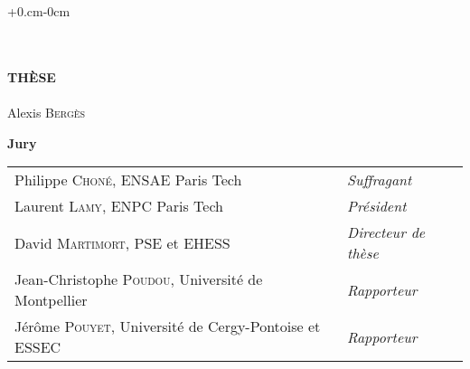 
\begin{titlepage}
\thispagestyle{empty}
\begin{adjustwidth}{+0.cm}{-0cm}
\begin{center}
 \\
\vspace*{3.5cm}
 \\
\vspace*{2.5cm}
\noindent \large \textbf{TH\`ESE} \\
\vspace*{0.4cm}
 \\
\vspace*{0.3cm}
\noindent \Large Alexis \textsc{Bergès} \\
\vspace*{2.5cm}
\end{center}
\begin{center}
\noindent \large \textbf{Jury} \\
\vspace{0.6cm}
\noindent \normalsize
\begin{tabular}{ll}
Philippe \textsc{Choné}, ENSAE Paris Tech & \textit{Suffragant} \\
Laurent \textsc{Lamy}, ENPC Paris Tech & \textit{Président} \\
David \textsc{Martimort}, PSE et EHESS & \textit{Directeur de thèse}\\
Jean-Christophe \textsc{Poudou}, Université de Montpellier & \textit{Rapporteur} \\
Jérôme \textsc{Pouyet}, Université de Cergy-Pontoise et ESSEC & \textit{Rapporteur} \\
\end{tabular}
\end{center}

\end{adjustwidth}
\end{titlepage}


\cleardoublepage
\thispagestyle{empty}
\titlepage

